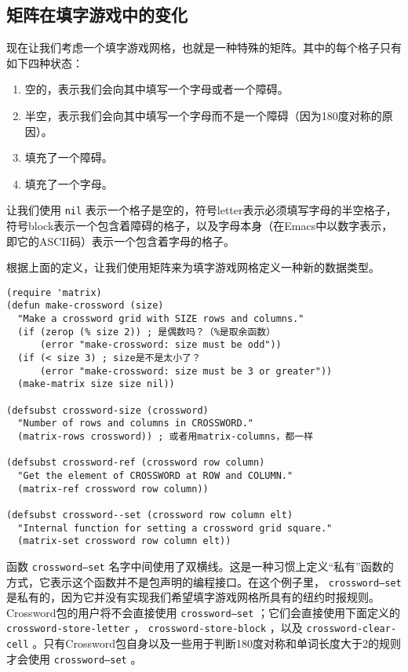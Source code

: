 \subsection{矩阵在填字游戏中的变化}
\label{section:10-Crossword-Variant-of-Matrix}

现在让我们考虑一个填字游戏网格，也就是一种特殊的矩阵。其中的每个格子只有如下四种状态：

\begin{enumerate}
  \item 空的，表示我们会向其中填写一个字母或者一个障碍。
  \item 半空，表示我们会向其中填写一个字母而不是一个障碍（因为180度对称的原因）。
  \item 填充了一个障碍。
  \item 填充了一个字母。
\end{enumerate}

让我们使用 \texttt{nil} 表示一个格子是空的，符号letter表示必须填写字母的半空格子，符号block表示一个包含着障碍的格子，以及字母本身（在Emacs中以数字表示，即它的ASCII码）表示一个包含着字母的格子。

根据上面的定义，让我们使用矩阵来为填字游戏网格定义一种新的数据类型。

\begin{verbatim}
(require 'matrix)
(defun make-crossword (size)
  "Make a crossword grid with SIZE rows and columns."
  (if (zerop (% size 2)) ; 是偶数吗？（%是取余函数）
      (error "make-crossword: size must be odd"))
  (if (< size 3) ; size是不是太小了？
      (error "make-crossword: size must be 3 or greater"))
  (make-matrix size size nil))

(defsubst crossword-size (crossword)
  "Number of rows and columns in CROSSWORD."
  (matrix-rows crossword)) ; 或者用matrix-columns，都一样

(defsubst crossword-ref (crossword row column)
  "Get the element of CROSSWORD at ROW and COLUMN."
  (matrix-ref crossword row column))

(defsubst crossword--set (crossword row column elt)
  "Internal function for setting a crossword grid square."
  (matrix-set crossword row column elt))
\end{verbatim}

函数 \texttt{crossword--set} 名字中间使用了双横线。这是一种习惯上定义“私有”函数的方式，它表示这个函数并不是包声明的编程接口。在这个例子里， \texttt{crossword--set} 是私有的，因为它并没有实现我们希望填字游戏网格所具有的纽约时报规则。Crossword包的用户将不会直接使用 \texttt{crossword--set} ；它们会直接使用下面定义的 \texttt{crossword-store-letter} ， \texttt{crossword-store-block} ，以及 \texttt{crossword-clear-cell} 。只有Crossword包自身以及一些用于判断180度对称和单词长度大于2的规则才会使用 \texttt{crossword--set} 。

